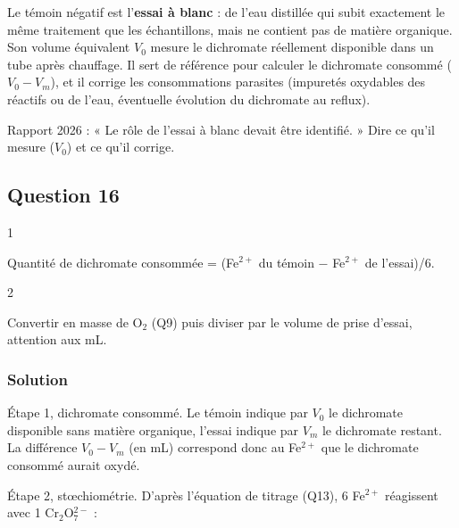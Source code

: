 \documentclass[11pt,a4paper]{article}
\newcommand{\equationajustee}[1]{%
  \sbox{\boiteequation}{$\displaystyle #1$}%
  \ifdim\wd\boiteequation>\linewidth
    \[\resizebox{\linewidth}{!}{\usebox{\boiteequation}}\]%
  \else
    \[#1\]%
  \fi}
\begin{document}
Le témoin négatif est l'\textbf{essai à blanc} : de l'eau distillée qui subit exactement le même traitement que les échantillons, mais ne contient pas de matière organique. Son volume équivalent \(V_0\) mesure le dichromate réellement disponible dans un tube après chauffage. Il sert de référence pour calculer le dichromate consommé (\(V_0-V_m\)), et il corrige les consommations parasites (impuretés oxydables des réactifs ou de l'eau, éventuelle évolution du dichromate au reflux).

\begin{jury}

Rapport 2026 : « Le rôle de l'essai à blanc devait être identifié. » Dire ce qu'il mesure (\(V_0\)) et ce qu'il corrige.

\end{jury}

\hypertarget{question-16}{%
\subsection{Question 16}\label{question-16}}

\begin{indication}{1}

Quantité de dichromate consommée = (Fe\(^{2+}\) du témoin − Fe\(^{2+}\) de l'essai)/6.

\end{indication}

\begin{indication}{2}

Convertir en masse de O\(_2\) (Q9) puis diviser par le volume de prise d'essai, attention aux mL.

\end{indication}

\hypertarget{solution-15}{%
\subsubsection{Solution}\label{solution-15}}

Étape 1, dichromate consommé. Le témoin indique par \(V_0\) le dichromate disponible sans matière organique, l'essai indique par \(V_m\) le dichromate restant. La différence \(V_0-V_m\) (en mL) correspond donc au Fe\(^{2+}\) que le dichromate consommé aurait oxydé.

Étape 2, stœchiométrie. D'après l'équation de titrage (Q13), 6 Fe\(^{2+}\) réagissent avec 1 Cr\(_2\)O\(_7^{2-}\) :

\equationajustee{n_{\text{cons}}=\frac{C_{\text{Mohr}}(V_0-V_m)\times10^{-3}}{6}\ \text{mol}}
\end{document}
